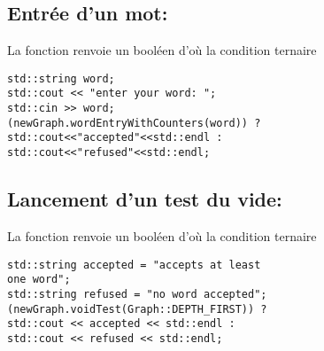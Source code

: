 \subsection{Entrée d'un mot:}
La fonction renvoie un booléen d'où la condition ternaire
\begin{verbatim} 
std::string word;
std::cout << "enter your word: ";
std::cin >> word;
(newGraph.wordEntryWithCounters(word)) ?
std::cout<<"accepted"<<std::endl : 
std::cout<<"refused"<<std::endl;
\end{verbatim}

\subsection{Lancement d'un test du vide:}
La fonction renvoie un booléen d'où la condition ternaire
\begin{verbatim} 
std::string accepted = "accepts at least 
one word";
std::string refused = "no word accepted";
(newGraph.voidTest(Graph::DEPTH_FIRST)) ? 
std::cout << accepted << std::endl :
std::cout << refused << std::endl;
\end{verbatim}
